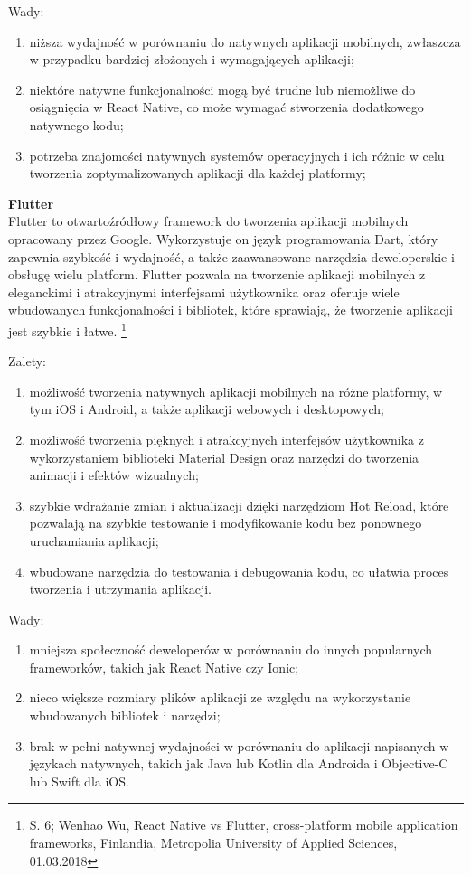 \documentclass[12pt, a4paper, twoside, openany]{book}
\begin{document}
Wady:
\begin{enumerate}[label=--]
    \item niższa wydajność w porównaniu do natywnych aplikacji mobilnych, zwłaszcza w przypadku bardziej złożonych i wymagających aplikacji;
    \item niektóre natywne funkcjonalności mogą być trudne lub niemożliwe do osiągnięcia w React Native, co może wymagać stworzenia dodatkowego natywnego kodu;
    \item potrzeba znajomości natywnych systemów operacyjnych i ich różnic w celu tworzenia zoptymalizowanych aplikacji dla każdej platformy;
\end{enumerate}

\textbf{Flutter\\}
\indent Flutter to otwartoźródłowy framework do tworzenia aplikacji mobilnych opracowany przez Google. Wykorzystuje on język programowania Dart, który zapewnia szybkość i wydajność, a także zaawansowane narzędzia deweloperskie i obsługę wielu platform. Flutter pozwala na tworzenie aplikacji mobilnych z eleganckimi i atrakcyjnymi interfejsami użytkownika oraz oferuje wiele wbudowanych funkcjonalności i bibliotek, które sprawiają, że tworzenie aplikacji jest szybkie i łatwe. \footnote{S. 6; Wenhao Wu, React Native vs Flutter, cross-platform mobile application frameworks, Finlandia, Metropolia University of Applied Sciences, 01.03.2018}

Zalety:
\begin{enumerate}[label=--]
    \item możliwość tworzenia natywnych aplikacji mobilnych na różne platformy, w tym iOS i Android, a także aplikacji webowych i desktopowych;
    \item możliwość tworzenia pięknych i atrakcyjnych interfejsów użytkownika z wykorzystaniem biblioteki Material Design oraz narzędzi do tworzenia animacji i efektów wizualnych;
    \item szybkie wdrażanie zmian i aktualizacji dzięki narzędziom Hot Reload, które pozwalają na szybkie testowanie i modyfikowanie kodu bez ponownego uruchamiania aplikacji;
    \item wbudowane narzędzia do testowania i debugowania kodu, co ułatwia proces tworzenia i utrzymania aplikacji.
\end{enumerate}

Wady:
\begin{enumerate}[label=--]
    \item mniejsza społeczność deweloperów w porównaniu do innych popularnych frameworków, takich jak React Native czy Ionic;
    \item nieco większe rozmiary plików aplikacji ze względu na wykorzystanie wbudowanych bibliotek i narzędzi;
    \item brak w pełni natywnej wydajności w porównaniu do aplikacji napisanych w językach natywnych, takich jak Java lub Kotlin dla Androida i Objective-C lub Swift dla iOS.
\end{enumerate}
\end{document}
